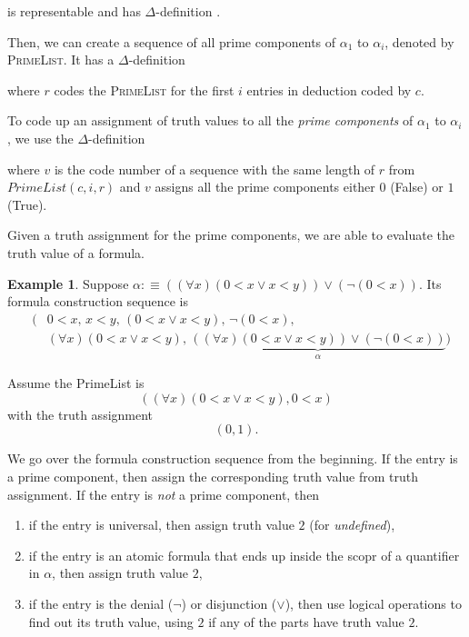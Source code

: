 \documentclass[11pt,letterpaper]{book}
\theoremstyle{definition}
\newtheorem{example}{Example}[section]
\begin{document}
\begin{enumerate}
is representable and has $\Delta$-definition .

Then, we can create a sequence of all prime components of $\alpha_1$ to $\alpha_i$, denoted by \textsc{PrimeList}. It has a $\Delta$-definition

\begin{center}
\end{center}

where $r$ codes the \textsc{PrimeList} for the first $i$ entries in deduction coded by $c$.


To code up an assignment of truth values to all the \emph{prime components} of $\alpha_1$ to $\alpha_i$, we use the $\Delta$-definition 

\begin{center}
\end{center}

where $v$ is the code number of a sequence with the same length of $r$ from $PrimeList(c, i, r)$ and $v$ assigns all the prime components either $0$ (False) or $1$ (True).

Given a truth assignment for the prime components, we are able to evaluate the truth value of a formula.

\begin{example}
Suppose $\alpha :\equiv ( (\forall x) (0 < x \lor x < y ) ) \lor ( \lnot ( 0 < x ) )$. Its formula construction sequence is
\begin{eqnarray*}
&\bigg(& 0 < x, \, x < y, \,  (0<x \lor x < y), \, \lnot (0 < x),  \\ 
& & (\forall x ) ( 0< x \lor x < y), \, \underbrace{ ( (\forall x) (0 < x \lor x < y ) ) \lor ( \lnot ( 0 < x ) ) }_{\alpha} \bigg)
\end{eqnarray*}

Assume the PrimeList is
$$ ( (\forall x ) ( 0< x \lor x < y), 0 < x ) $$
with the truth assignment
$$ (0, 1) .$$

We go over the formula construction sequence from the beginning. If the entry is a prime component, then assign the corresponding truth value from truth assignment. If the entry is \emph{not} a prime component, then
\begin{enumerate}
\item{if the entry is universal, then assign truth value $2$ (for \emph{undefined}),}
\item{if the entry is an atomic formula that ends up inside the scopr of a quantifier in $\alpha$, then assign truth value $2$,}
\item{if the entry is the denial ($\lnot$) or disjunction ($\lor$), then use logical operations to find out its truth value, using $2$ if any of the parts have truth value $2$. }
\end{enumerate}


\end{example}
\end{enumerate}
\end{document}
